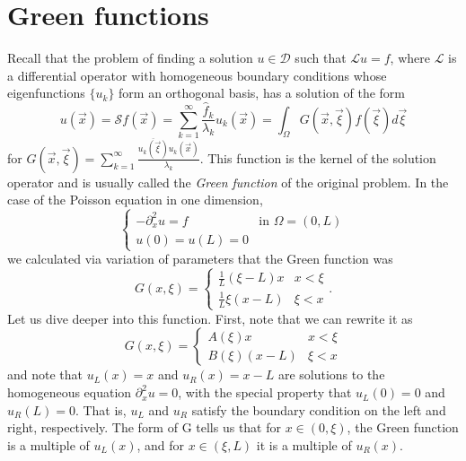 \section{Green functions} 
Recall that the problem of finding a solution $u\in\mathcal{D}$ such that $\mathcal{L}u=f$, where $\mathcal{L}$ is a differential operator with homogeneous boundary conditions whose eigenfunctions $\{u_k\}$ form an orthogonal basis, has a solution of the form
\begin{equation*}
    u(\vec{x})=\mathcal{S}f(\vec{x})=\sum_{k=1}^{\infty}\frac{\hat{f}_{k}}{\lambda_{k}}u_{k}(\vec{x})=\int_{\Omega}G(\vec{x},\vec{\xi})f(\vec{\xi})d\vec{\xi}
\end{equation*}
for $G(\vec{x},\vec{\xi})=\sum_{k=1}^{\infty}\frac{\overline{u_{k}(\vec{\xi})}u_{k}(\vec{x})}{\lambda_{k}}$.  This function is the kernel of the solution operator and is usually called the \textit{Green function} of the original problem. In the case of the Poisson equation in one dimension,
\begin{equation*}
    \begin{cases}-\partial_{x}^{2}u=f&\text{in }\Omega=(0,L)\\ u(0)=u(L)=0\end{cases}
\end{equation*}
we calculated via variation of parameters that the Green function was
\begin{equation*}
    G(x,\xi)=\begin{cases}\frac{1}{L}(\xi-L)x&x<\xi\\ \frac{1}{L}\xi(x-L)&\xi<x\end{cases}.
\end{equation*}
Let us dive deeper into this function. First, note that we can rewrite it as 
\begin{equation*}
    G(x,\xi)=\begin{cases}A(\xi)x&x<\xi\\ B(\xi)(x-L)&\xi<x\end{cases}
\end{equation*}
and note that $u_{L}(x)=x$ and $u_{R}(x)=x-L$ are solutions to the homogeneous equation $\partial_{x}^{2}u=0$, with the special property that $u_{L}(0)=0$ and $u_{R}(L)=0$. That is, $u_L$ and $u_R$ satisfy the boundary condition on the left and right, respectively. The form of G tells us that for $x \in (0,\xi)$, the Green function is a multiple of $u_L(x)$, and for $x \in (\xi,L)$ it is a multiple of $u_R(x)$. 

